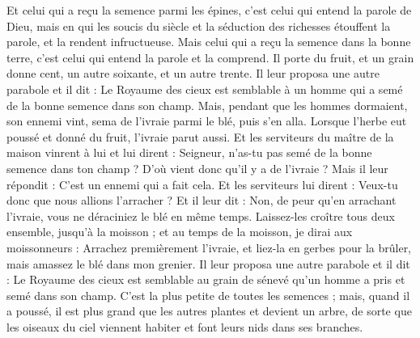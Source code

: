 \begin{multicols}{2}
Et celui qui a reçu la semence parmi les épines, c'est celui qui entend la parole de Dieu, mais en qui les soucis du siècle et la séduction des richesses étouffent la parole, et la rendent infructueuse.
Mais celui qui a reçu la semence dans la bonne terre, c'est celui qui entend la parole et la comprend. Il porte du fruit, et un grain donne cent, un autre soixante, et un autre trente.
Il leur proposa une autre parabole et il dit : Le Royaume des cieux est semblable à un homme qui a semé de la bonne semence dans son champ.
Mais, pendant que les hommes dormaient, son ennemi vint, sema de l'ivraie parmi le blé, puis s'en alla.
Lorsque l'herbe eut poussé et donné du fruit, l'ivraie parut aussi.
Et les serviteurs du maître de la maison vinrent à lui et lui dirent : Seigneur, n'as-tu pas semé de la bonne semence dans ton champ ? D'où vient donc qu'il y a de l'ivraie ?
Mais il leur répondit : C'est un ennemi qui a fait cela. Et les serviteurs lui dirent : Veux-tu donc que nous allions l'arracher ?
Et il leur dit : Non, de peur qu'en arrachant l'ivraie, vous ne déraciniez le blé en même temps.
Laissez-les croître tous deux ensemble, jusqu'à la moisson ; et au temps de la moisson, je dirai aux moissonneurs : Arrachez premièrement l'ivraie, et liez-la en gerbes pour la brûler, mais amassez le blé dans mon grenier.
Il leur proposa une autre parabole et il dit : Le Royaume des cieux est semblable au grain de sénevé qu'un homme a pris et semé dans son champ.
C'est la plus petite de toutes les semences ; mais, quand il a poussé, il est plus grand que les autres plantes et devient un arbre, de sorte que les oiseaux du ciel viennent habiter et font leurs nids dans ses branches.

\end{multicols}
